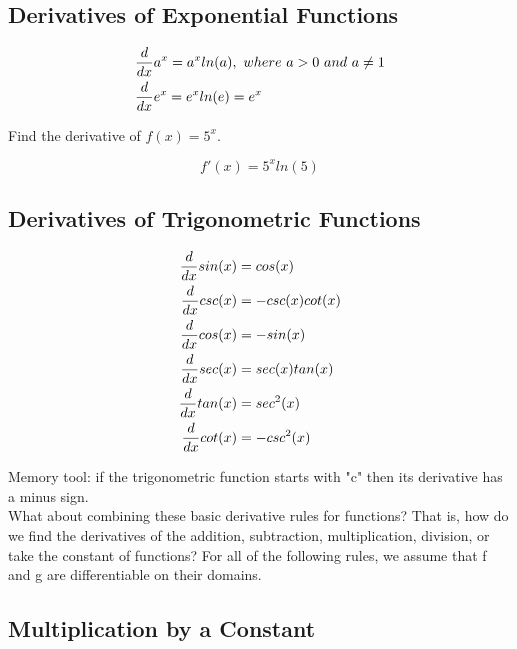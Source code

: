 \subsection{Derivatives of Exponential Functions}

\begin{theorem}
    \begin{align}
         & {d \over dx}a^x = a^xln(a),\ where\ a > 0\ and\ a \neq 1 \\
         & {d \over dx}e^x = e^xln(e) = e^x
    \end{align}
\end{theorem}

\begin{exercise}\nonumber
    Find the derivative of $ f(x) = 5^x $.

    $$
        f'(x) = 5^xln(5)
    $$
\end{exercise}

\subsection{Derivatives of Trigonometric Functions}

\begin{theorem}
    \begin{align}
        {d \over dx}sin(x) & = cos(x)        \\
        {d \over dx}csc(x) & = -csc(x)cot(x) \\
        {d \over dx}cos(x) & = -sin(x)       \\
        {d \over dx}sec(x) & = sec(x)tan(x)  \\
        {d \over dx}tan(x) & = sec^2(x)      \\
        {d \over dx}cot(x) & = -csc^2(x)
    \end{align}
\end{theorem}

Memory tool: if the trigonometric function starts with "c" then its derivative has a minus sign. \\

What about combining these basic derivative rules for functions? That is, how do we find the derivatives of the addition, subtraction, multiplication, division, or take the constant of functions? For all of the following rules, we assume that f and g are differentiable on their domains. \\

\subsection{Multiplication by a Constant}

